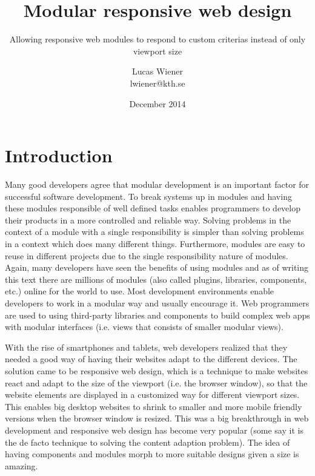 \documentclass[oneside,a4paper,11pt]{kth-mag}
\title{Modular responsive web design}
\subtitle{Allowing responsive web modules to respond to custom criterias instead of only viewport size}
\author{Lucas Wiener \\ \lowercase{lwiener@kth.se}}
\date{December 2014}
\begin{document}
\frontmatter
\pagestyle{empty}
\removepagenumbers
\maketitle
\mainmatter
\section*{Introduction}

Many good developers agree that modular development is an important factor for successful software development. To break systems up in modules and having these modules responsible of well defined tasks enables programmers to develop their products in a more controlled and reliable way. Solving problems in the context of a module with a single responsibility is simpler than solving problems in a context which does many different things. Furthermore, modules are easy to reuse in different projects due to the single responsibility nature of modules. Again, many developers have seen the benefits of using modules and as of writing this text there are millions of modules (also called plugins, libraries, components, etc.) online for the world to use. Most development environments enable developers to work in a modular way and usually encourage it. Web programmers are used to using third-party libraries and components to build complex web apps with modular interfaces (i.e. views that consists of smaller modular views).

With the rise of smartphones and tablets, web developers realized that they needed a good way of having their websites adapt to the different devices. The solution came to be responsive web design, which is a technique to make websites react and adapt to the size of the viewport (i.e. the browser window), so that the website elements are displayed in a customized way for different viewport sizes. This enables big desktop websites to shrink to smaller and more mobile friendly versions when the browser window is resized. This was a big breakthrough in web development and responsive web design has become very popular (some say it is the de facto technique to solving the content adaption problem). The idea of having components and modules morph to more suitable designs given a size is amazing.
\end{document}
